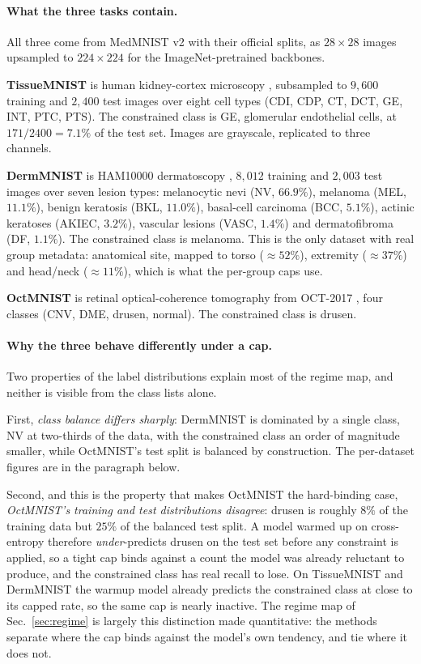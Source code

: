 \documentclass[10pt]{article}
\begin{document}
{\paragraph{What the three tasks contain.}
All three come from MedMNIST v2 \citep{yang2023medmnist} with their official
splits, as $28{\times}28$ images upsampled to $224{\times}224$ for the
ImageNet-pretrained backbones.

\textbf{TissueMNIST} is human kidney-cortex microscopy
\citep{woloshuk2021situ}, subsampled to $9{,}600$ training and $2{,}400$ test
images over eight cell types (CDI, CDP, CT, DCT, GE, INT, PTC, PTS). The
constrained class is GE, glomerular endothelial cells, at $171/2400 = 7.1\%$ of
the test set. Images are grayscale, replicated to three channels.

\textbf{DermMNIST} is HAM10000 dermatoscopy \citep{tschandl2018ham10000},
$8{,}012$ training and $2{,}003$ test images over seven lesion types: melanocytic
nevi (NV, $66.9\%$), melanoma (MEL, $11.1\%$), benign keratosis (BKL, $11.0\%$),
basal-cell carcinoma (BCC, $5.1\%$), actinic keratoses (AKIEC, $3.2\%$),
vascular lesions (VASC, $1.4\%$) and dermatofibroma (DF, $1.1\%$). The
constrained class is melanoma. This is the only dataset with real group
metadata: anatomical site, mapped to torso ($\approx52\%$), extremity
($\approx37\%$) and head/neck ($\approx11\%$), which is what the per-group caps
use.

\textbf{OctMNIST} is retinal optical-coherence tomography from OCT-2017
\citep{kermany2018identifying}, four classes (CNV, DME, drusen, normal). The
constrained class is drusen.

\paragraph{Why the three behave differently under a cap.}
Two properties of the label distributions explain most of the regime map, and
neither is visible from the class lists alone.

First, \emph{class balance differs sharply}: DermMNIST is dominated by a single
class, NV at two-thirds of the data, with the constrained class an order of
magnitude smaller, while OctMNIST's test split is balanced by construction. The
per-dataset figures are in the paragraph below.

Second, and this is the property that makes OctMNIST the hard-binding case,
\emph{OctMNIST's training and test distributions disagree}: drusen is roughly
$8\%$ of the training data but $25\%$ of the balanced test split. A model warmed
up on cross-entropy therefore \emph{under}-predicts drusen on the test set
before any constraint is applied, so a tight cap binds against a count the model
was already reluctant to produce, and the constrained class has real recall to
lose. On TissueMNIST and DermMNIST the warmup model already predicts the
constrained class at close to its capped rate, so the same cap is nearly
inactive. The regime map of Sec.~\ref{sec:regime} is largely this distinction
made quantitative: the methods separate where the cap binds against the model's
own tendency, and tie where it does not.

}
\end{document}
